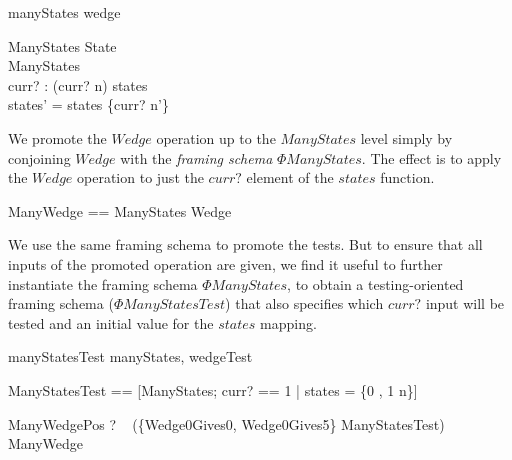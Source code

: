 \documentclass{llncs}
\begin{document}
\begin{zsection}
  \SECTION manyStates \parents wedge
\end{zsection}

\vspace{-5ex}
\begin{schema}{\Phi ManyStates}
  \Delta State \\
  \Delta ManyStates \\
  curr? : \nat
\where
  (curr? \mapsto n) \in states \\
  states' = states \oplus \{curr? \mapsto n'\}
\end{schema}

We promote the $Wedge$ operation up to the $ManyStates$ level simply by
conjoining $Wedge$ with the \emph{framing schema} $\Phi ManyStates$.
The effect is to apply the $Wedge$ operation to just the $curr?$ element of
the $states$ function. 

\begin{zed}
  ManyWedge == \Phi ManyStates \land Wedge
\end{zed}


We use the same framing schema to promote the tests.  But to ensure
that all inputs of the promoted operation are given, we find it useful
to further instantiate the framing schema $\Phi ManyStates$, to obtain
a testing-oriented framing schema ($\Phi ManyStatesTest$) that also
specifies which $curr?$ input will be tested and an initial value for the
$states$ mapping.

\begin{zsection}
  \SECTION manyStatesTest \parents manyStates, wedgeTest
\end{zsection}
\vspace{-5ex}
\begin{zed}
  \Phi ManyStatesTest ==
    [\Phi ManyStates; curr? == 1 | states = \{0 , 1 \mapsto n\}]
\end{zed}
\vspace{-5ex}
\begin{theorem}{ManyWedgePos}
  \vdash? ~ (\{Wedge0Gives0, Wedge0Gives5\} \land \Phi ManyStatesTest)
      \subseteq ManyWedge
\end{theorem}
\end{document}
